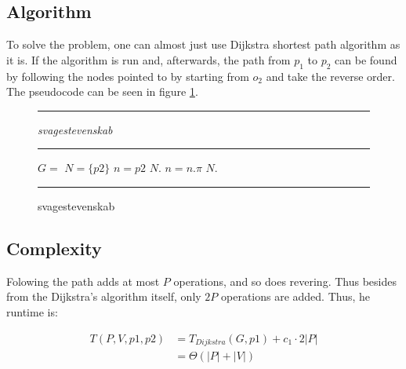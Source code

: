 \subsection{Algorithm}

To solve the problem, one can almost just use Dijkstra
shortest path algorithm as it is. If the algorithm is run
and, afterwards, the path from $p_1$ to $p_2$ can be found
by following the nodes pointed to by starting from $o_2$ and 
take the reverse order. The pseudocode can 
be seen in figure \ref{fig:shortpathcode}.


\begin{figure}[ht!]
\hrule
\vspace{0.2cm}
{\centering  \textit{svagestevenskab}}
\vspace{0.2cm}
\hrule
\begin{algorithmic}
\State $G = $ 
\State {}
\State $N = \{p2\}$
\State $n = p2$
\State $N.$
\State $n = n.\pi$
\EndWhile
\State \Return $N.$
\EndFunction
\end{algorithmic}
\hrule
\caption{svagestevenskab  \label{fig:shortpathcode}}
\end{figure}

\subsection{Complexity}

Folowing the path adds at most $P$ operations, and so does revering.
Thus besides from the Dijkstra's algorithm itself, only $2P$ operations
are added. Thus, he runtime is: 

\begin{align*}
T(P, V, p1, p2) &= T_{Dijkstra} \left( G, p1 \right) + c_1 \cdot 2 |P|\\
 &= \Theta \left( |P| + |V| \right)
\end{align*}


